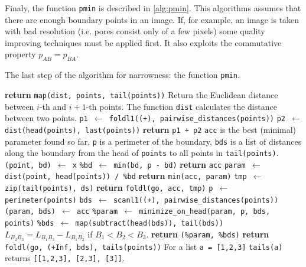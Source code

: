\documentclass[reprint,amsmath,amssymb,aps,pre,showkeys,showpacs]{revtex4-1}
\begin{document}
Finaly, the function \texttt{pmin} is described in \cref{alg:pmin}. This
algorithms assumes that there are enough boundary points in an image. If, for
example, an image is taken with bad resolution (i.e. pores consist only of a few
pixels) some quality improving techniques must be applied first. It also
exploits the commutative property $p_{AB} = p_{BA}$.
\begin{algorithm}[H]
  \caption{The last step of the algorithm for narrowness: the function
    \texttt{pmin}.}
  \label{alg:pmin}
  \begin{algorithmic}[1]
    \State \textbf{return} \texttt{map(dist, points, tail(points))}
    \Comment Return the Euclidean distance between $i$-th and $i+1$-th
    points. The function \texttt{dist} calculates the distance between two
    points.
    \EndProcedure
    \State \texttt{p1 $\gets$ foldl1((+), pairwise\_distances(points))}
    \State \texttt{p2 $\gets$ dist(head(points), last(points))}
    \State \textbf{return} \texttt{p1 + p2}
    \EndProcedure
    \Comment \texttt{acc} is the best (minimal) parameter found so far,
    \texttt{p} is a perimeter of the boundary, \texttt{bds} is a list of
    distances along the boundary from the head of \texttt{points} to all points
    in \texttt{tail(points)}.
    \State \texttt{(point, bd) $\gets$ x}
    \State \texttt{\%bd $\gets$ min(bd, p - bd)}
    \State \textbf{return} \texttt{acc}
    \Else
    \State \texttt{param $\gets$ dist(point, head(points)) / \%bd}
    \State \textbf{return} \texttt{min(acc, param)}
    \EndIf
    \EndProcedure
    \State \texttt{tmp $\gets$ zip(tail(points), ds)}
    \State \textbf{return} \texttt{foldl(go, acc, tmp)}
    \EndProcedure
    \State \texttt{p $\gets$ perimeter(points)}
    \State \texttt{bds $\gets$ scanl1((+), pairwise\_distances(points))}
    \State \texttt{(param, bds) $\gets$ acc}
    \State \texttt{\%param $\gets$ minimize\_on\_head(param, p, bds, points)}
    \State \texttt{\%bds  $\gets$ map(subtract(head(bds)), tail(bds))}
    \Comment $L_{B_2B_3} = L_{B_1B_3} - L_{B_1B_2}$ if $B_1 < B_2 < B_3$.
    \State \textbf{return} \texttt{(\%param, \%bds)}
    \EndProcedure
    \State \textbf{return} \texttt{foldl(go, (+Inf, bds), tails(points))}
    \Comment For a list \texttt{a = [1,2,3]} \texttt{tails(a)} returns
    \texttt{[[1,2,3], [2,3], [3]]}.
    \EndProcedure
  \end{algorithmic}
\end{algorithm}
\end{document}
